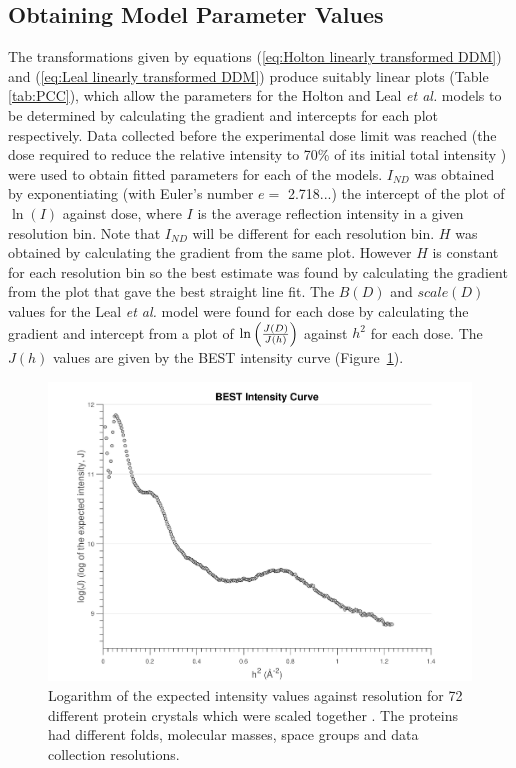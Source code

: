 \subsection{Obtaining Model Parameter Values}
\label{sub:Obtaining Model Parameter Values}
The transformations given by equations (\ref{eq:Holton linearly transformed DDM}) and (\ref{eq:Leal linearly transformed DDM}) produce suitably linear plots (Table \ref{tab:PCC}), which allow the parameters for the Holton and Leal \emph{et al.} models to be determined by calculating the gradient and intercepts for each plot respectively.
Data collected before the experimental dose limit was reached (the dose required to reduce the relative intensity to 70\% of its initial total intensity \cite{owen2006}) were used to obtain fitted parameters for each of the models.
$I_{ND}$ was obtained by exponentiating (with Euler's number $e =$ 2.718...) the intercept of the plot of $\ln(I)$ against dose, where $I$ is the average reflection intensity in a given resolution bin.
Note that $I_{ND}$ will be different for each resolution bin.
$H$ was obtained by calculating the gradient from the same plot.
However $H$ is constant for each resolution bin so the best estimate was found by calculating the gradient from the plot that gave the best straight line fit.
\newline
The $B(D)$ and $scale(D)$ values for the Leal \emph{et al.} model were found for each dose by calculating the gradient and intercept from a plot of $\ln \left(\frac{J(D)}{J(h)}\right)$ against $h^2$ for each dose.
The $J(h)$ values are given by the BEST intensity curve \cite{popov2003} (Figure~\ref{fig:BEST curve}).
\begin{figure}
    \centering
    \includegraphics[width=1\textwidth]{figures/dwd/bestcurve.pdf}
    \caption{Logarithm of the expected intensity values against resolution for 72 different protein crystals which were scaled together \cite{popov2003}. The proteins had different folds, molecular masses, space groups and data collection resolutions.}
    \label{fig:BEST curve}
\end{figure}
